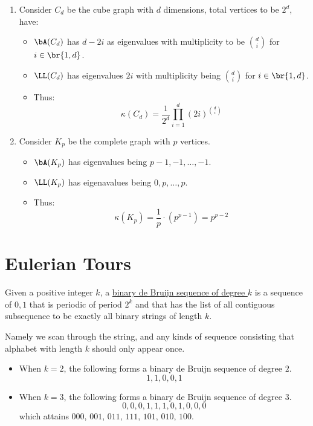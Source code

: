 \begin{eg}
	\leavevmode
	\begin{enumerate}
		\item Consider \( C_d \) be the cube graph with \( d \) dimensions, total vertices to be \( 2^d \), have:
		      \begin{itemize}
			      \item \( \bA(C_d) \) has \( d-2i \) as eigenvalues with multiplicity to be \( \binom{d}{i} \) for \( i \in \br{1,d} \).
			      \item \( \LL(C_d) \) has eigenvalues \( 2i \) with multiplicity being \( \binom{d}{i} \) for \( i\in \br{1,d} \).
			      \item Thus:
			            \[
				            \kappa(C_d)  =\frac{1}{2^d} \prod_{i=1}^d (2i)^{\binom{d}{i}}
			            \]
		      \end{itemize}
		\item Consider \( K_p \) be the complete graph with \( p \) vertices.
		      \begin{itemize}
			      \item \( \bA(K_p) \) has eigenvalues being \( p-1, -1, \ldots, -1 \).
			      \item \( \LL(K_p) \) has eigenavalues being \( 0, p, \ldots, p \).
			      \item Thus:
			            \[
				            \kappa(K_p) = \frac{1}{p} \cdot (p^{p-1}) = p^{p-2}
			            \]
		      \end{itemize}
	\end{enumerate}
\end{eg}

\section{Eulerian Tours}

\begin{definition}
	Given a positive integer \( k \), a \underline{binary de Bruijn sequence of degree \( k \)} is a sequence of \( 0,1 \) that is periodic of period \( 2^k \) and that has the list of all contiguous subsequence to be exactly all binary strings of length \( k \).
\end{definition}

Namely we scan through the string, and any kinds of sequence consisting that alphabet with length \( k \) should only appear once.

\begin{eg}
	\leavevmode
	\begin{itemize}
		\item When \( k=2 \), the following forms a binary de Bruijn sequence of degree \( 2 \).
		      \[
			      1,1,0,0,1
		      \]
		\item When \( k=3 \), the following forms a binary de Bruijn sequence of degree \( 3 \).
		      \[
			      0,0,0,1,1,1,0,1,0,0,0
		      \]
		      which attains \( 000 \), \( 001 \), \( 011 \), \( 111 \), \( 101 \), \( 010 \), \( 100 \).
	\end{itemize}
\end{eg}

